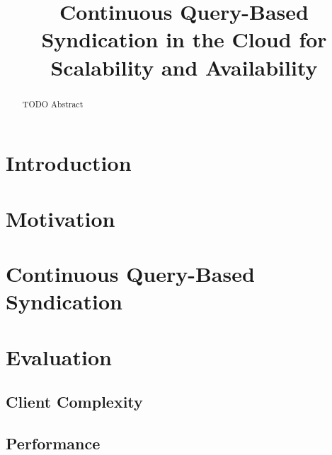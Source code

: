 \documentclass[conference]{IEEEtran}
\begin{document}
\title{Continuous Query-Based Syndication in the Cloud for Scalability and Availability}

\author{
\and
{}
}

\maketitle

\begin{abstract}
TODO Abstract
\end{abstract}

\section{Introduction} %


\section{Motivation} 


\section{Continuous Query-Based Syndication} %



\section{Evaluation}

\subsection{Client Complexity}

\subsection{Performance}
\end{document}
